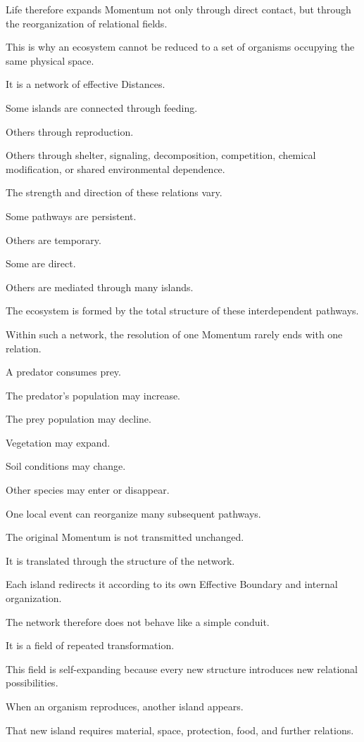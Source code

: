 Life therefore expands Momentum not only through direct contact, but through the reorganization of relational fields.

This is why an ecosystem cannot be reduced to a set of organisms occupying the same physical space.

It is a network of effective Distances.

Some islands are connected through feeding.

Others through reproduction.

Others through shelter, signaling, decomposition, competition, chemical modification, or shared environmental dependence.

The strength and direction of these relations vary.

Some pathways are persistent.

Others are temporary.

Some are direct.

Others are mediated through many islands.

The ecosystem is formed by the total structure of these interdependent pathways.

Within such a network, the resolution of one Momentum rarely ends with one relation.

A predator consumes prey.

The predator’s population may increase.

The prey population may decline.

Vegetation may expand.

Soil conditions may change.

Other species may enter or disappear.

One local event can reorganize many subsequent pathways.

The original Momentum is not transmitted unchanged.

It is translated through the structure of the network.

Each island redirects it according to its own Effective Boundary and internal organization.

The network therefore does not behave like a simple conduit.

It is a field of repeated transformation.

This field is self-expanding because every new structure introduces new relational possibilities.

When an organism reproduces, another island appears.

That new island requires material, space, protection, food, and further relations.

